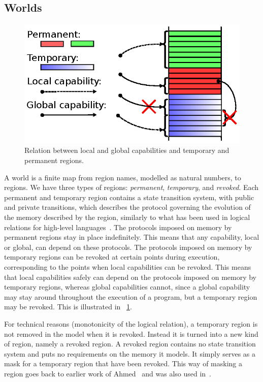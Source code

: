 \documentclass[compsoc,conference,letterpaper,fleqn]{IEEEtran}
\newcommand{\plainview}[1]{\mathrm{#1}}
\newcommand{\perma}{\plainview{perm}}
\newcommand{\temp}{\plainview{temp}}
\newcommand{\revoked}{\plainview{revoked}}
\begin{document}
\subsection{Worlds}
\begin{figure}[htbp]
  \centering
  \includegraphics{w11}
  \caption{Relation between local and global capabilities and temporary and permanent regions.}
  \label{fig:cap-world}
\end{figure}
A world is a finite map from region names, modelled as natural numbers, to regions.
We have three types of regions: \emph{permanent}, \emph{temporary}, and \emph{revoked}.
Each permanent and temporary region contains a state transition system, with
public and private transitions, which describes the protocol governing
the evolution of the memory described by the region, similarly to what
has been used in logical relations for high-level
languages~\cite{Ahmed:popl09,Dreyer:jfp12,Devriese:2016ObjCap}. 
The protocols imposed on memory by permanent regions stay in place
indefinitely. This means that any capability, local or global, can
depend on these protocols. The protocols imposed on memory by temporary
regions can be revoked at certain points during execution,
corresponding to the points when local capabilities can be
revoked. This means that local capabilities safely can depend on the
protocols imposed on memory by temporary regions, whereas global
capabilities cannot, since a global capability may stay around
throughout the execution of a program, but a temporary region may be
revoked. This is illustrated in \figurename~\ref{fig:cap-world}.

For technical reasons (monotonicity of the logical relation), a
temporary region is not removed in the model when it is
revoked. Instead it is turned into a new kind of region, namely a
revoked region. A revoked region contains no state transition
system and puts no requirements on the memory it models. It
simply serves as a mask for a temporary region that have been revoked.
This way of masking a region goes back to earlier work of
Ahmed~\cite{Ahmed2004semantics} and was also used in~\cite{Thamsborg:2011:KLR:2034773.2034831}.
\end{document}
